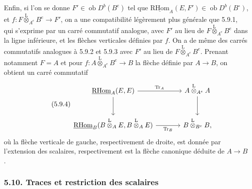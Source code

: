 \documentclass[11pt]{article}
\newcommand{\R}{\mathrm{R}}\newcommand{\RHomCore}{\mathrm{RHom}}
\newcommand{\ob}{\operatorname{ob}}
\providecommand{\RHom}{\RHomCore}
\providecommand{\uRHom}{\underline{\RHom}}
\providecommand{\Tr}{\operatorname{Tr}}
\providecommand{\Tr}{\operatorname{Tr}}
\providecommand{\lten}{\overset{\mathrm L}{\otimes}}
\providecommand{\Tr}{\operatorname{Tr}}
\providecommand{\RHom}{\RHomCore}
\providecommand{\ob}{\operatorname{ob}}
\providecommand{\lten}{\overset{\mathrm L}{\otimes}}
\providecommand{\RHom}{\R\mathcal{H}om}
\providecommand{\lten}{\overset{\mathrm L}{\otimes}}
\providecommand{\R}{\mathrm R}
\providecommand{\Tr}{\operatorname{Tr}}
\providecommand{\lten}{\overset{\mathrm L}{\otimes}}
\providecommand{\lten}{\overset{\mathrm L}{\otimes}}
\providecommand{\lten}{\overset{\mathrm L}{\otimes}}
\providecommand{\RHom}{\RHomCore}
\providecommand{\Tr}{\operatorname{Tr}}
\providecommand{\lten}{\overset{\mathrm L}{\otimes}}
\begin{document}
Enfin, si l'on se donne $F'\in\ob D^b(B^e)$ tel que $\uRHom_A(E,F')\in\ob D^b(B^\circ)$, et $f:F\lten_{A^e}B^e\to F'$, on a une compatibilité légèrement plus générale que 5.9.1, qui s'exprime par un carré commutatif analogue, avec $F'$ au lieu de $F\lten_{A^e}B^e$ dans la ligne inférieure, et les flèches verticales définies par $f$. On a de même des carrés commutatifs analogues à 5.9.2 et 5.9.3 avec $F'$ au lieu de $F\lten_{A^e}B^e$. Prenant notamment $F=A$ et pour $f:A\lten_{A^e}B^e\to B$ la flèche définie par $A\to B$, on obtient un carré commutatif
\begin{equation}\tag{5.9.4}
\begin{tikzcd}[column sep=large,row sep=large]
\uRHom_A(E,E) \arrow[r,"\Tr_A"] \arrow[d] & A\lten_{A^e}A \arrow[d]\\
\uRHom_B(B\lten_AE,B\lten_AE) \arrow[r,"\Tr_B"'] & B\lten_{B^e}B,
\end{tikzcd}
\end{equation}
où la flèche verticale de gauche, respectivement de droite, est donnée par l'extension des scalaires, respectivement est la flèche canonique déduite de $A\to B$.

\subsubsection*{5.10. Traces et restriction des scalaires}
\end{document}
